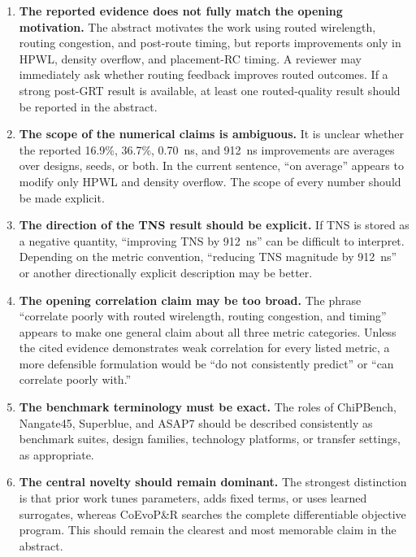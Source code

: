 \documentclass[11pt]{article}
\begin{document}
\begin{enumerate}
  \item \textbf{The reported evidence does not fully match the opening
  motivation.} The abstract motivates the work using routed wirelength,
  routing congestion, and post-route timing, but reports improvements only in
  HPWL, density overflow, and placement-RC timing. A reviewer may immediately
  ask whether routing feedback improves routed outcomes. If a strong post-GRT
  result is available, at least one routed-quality result should be reported in
  the abstract.

  \item \textbf{The scope of the numerical claims is ambiguous.} It is unclear
  whether the reported 16.9\%, 36.7\%, 0.70~ns, and 912~ns improvements are
  averages over designs, seeds, or both. In the current sentence, ``on average''
  appears to modify only HPWL and density overflow. The scope of every number
  should be made explicit.

  \item \textbf{The direction of the TNS result should be explicit.} If TNS is
  stored as a negative quantity, ``improving TNS by 912~ns'' can be difficult
  to interpret. Depending on the metric convention, ``reducing TNS magnitude
  by 912~ns'' or another directionally explicit description may be better.

  \item \textbf{The opening correlation claim may be too broad.} The phrase
  ``correlate poorly with routed wirelength, routing congestion, and timing''
  appears to make one general claim about all three metric categories. Unless
  the cited evidence demonstrates weak correlation for every listed metric, a
  more defensible formulation would be ``do not consistently predict'' or
  ``can correlate poorly with.''

  \item \textbf{The benchmark terminology must be exact.} The roles of
  ChiPBench, Nangate45, Superblue, and ASAP7 should be described consistently
  as benchmark suites, design families, technology platforms, or transfer
  settings, as appropriate.

  \item \textbf{The central novelty should remain dominant.} The strongest
  distinction is that prior work tunes parameters, adds fixed terms, or uses
  learned surrogates, whereas CoEvoP\&R searches the complete differentiable
  objective program. This should remain the clearest and most memorable claim
  in the abstract.
\end{enumerate}
\end{document}
